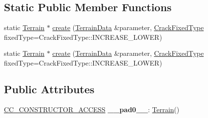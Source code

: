\subsection*{Static Public Member Functions}
\begin{DoxyCompactItemize}
\item 
static \hyperlink{classTerrain}{Terrain} $\ast$ \hyperlink{classTerrain_a5e5cf615b8942d8d26f2d09de7f6ce04}{create} (\hyperlink{structTerrain_1_1TerrainData}{Terrain\+Data} \&parameter, \hyperlink{classTerrain_af3dc2d6c44474fdbd9552d69e553ef93}{Crack\+Fixed\+Type} fixed\+Type=Crack\+Fixed\+Type\+::\+I\+N\+C\+R\+E\+A\+S\+E\+\_\+\+L\+O\+W\+ER)
\item 
static \hyperlink{classTerrain}{Terrain} $\ast$ \hyperlink{classTerrain_ab4ba510e2bcb3566177f62471870cdc1}{create} (\hyperlink{structTerrain_1_1TerrainData}{Terrain\+Data} \&parameter, \hyperlink{classTerrain_af3dc2d6c44474fdbd9552d69e553ef93}{Crack\+Fixed\+Type} fixed\+Type=Crack\+Fixed\+Type\+::\+I\+N\+C\+R\+E\+A\+S\+E\+\_\+\+L\+O\+W\+ER)
\end{DoxyCompactItemize}
\subsection*{Public Attributes}
\begin{DoxyCompactItemize}
\item 
\mbox{\label{classTerrain_a66cbe83e4bc0fa804097943e0a0ccfd1}} 
\hyperlink{_2cocos2d_2cocos_2base_2ccConfig_8h_a25ef1314f97c35a2ed3d029b0ead6da0}{C\+C\+\_\+\+C\+O\+N\+S\+T\+R\+U\+C\+T\+O\+R\+\_\+\+A\+C\+C\+E\+SS} {\bfseries \+\_\+\+\_\+pad0\+\_\+\+\_\+}\+: \hyperlink{classTerrain}{Terrain}()
\end{DoxyCompactItemize}
